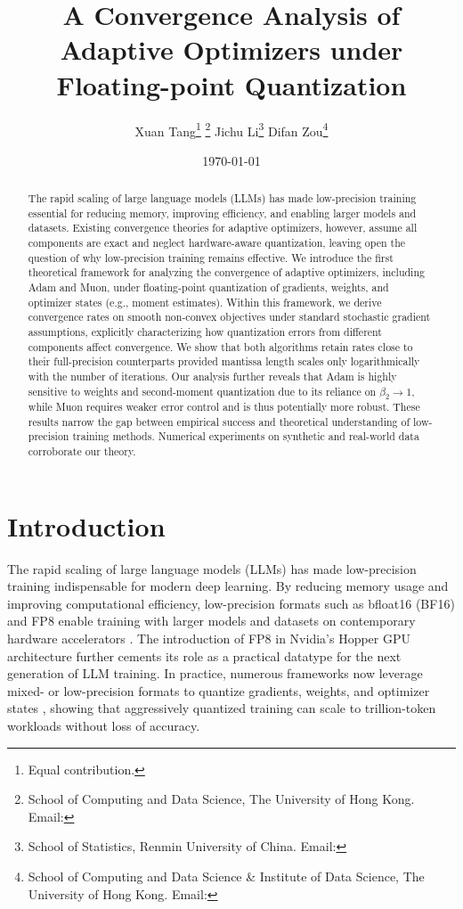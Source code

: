 \documentclass[11pt, letterpaper]{article}
\title{\LARGE A Convergence Analysis of Adaptive Optimizers under Floating-point Quantization}
\author{
Xuan Tang\thanks{Equal contribution.} \thanks{School of Computing and Data Science, The University of Hong Kong. Email: \email{xuantang8}{connect.hku.hk}}
\qquad
Jichu Li\footnotemark[1] \thanks{School of Statistics, Renmin University of China. Email: \email{lijichu52}{gmail.com}}\qquad 
Difan Zou\thanks{School of Computing and Data Science \& Institute of Data Science, The University of Hong Kong. Email: \email{dzou}{hku.hk}}
}
\date{\small{\today}}
\begin{document}

\maketitle

\begin{abstract}
    The rapid scaling of large language models (LLMs) has made low-precision training essential for reducing memory, improving efficiency, and enabling larger models and datasets. Existing convergence theories for adaptive optimizers, however, assume all components are exact and neglect hardware-aware quantization, leaving open the question of why low-precision training remains effective. We introduce the first theoretical framework for analyzing the convergence of adaptive optimizers, including Adam and Muon, under floating-point quantization of gradients, weights, and optimizer states (e.g., moment estimates). Within this framework, we derive convergence rates on smooth non-convex objectives under standard stochastic gradient assumptions, explicitly characterizing how quantization errors from different components affect convergence. We show that both algorithms retain rates close to their full-precision counterparts provided mantissa length scales only logarithmically with the number of iterations. Our analysis further reveals that Adam is highly sensitive to weights and second-moment quantization due to its reliance on $\beta_2 \to 1$, while Muon requires weaker error control and is thus potentially more robust. These results narrow the gap between empirical success and theoretical understanding of low-precision training methods. Numerical experiments on synthetic and real-world data corroborate our theory.
\end{abstract}



\section{Introduction}

The rapid scaling of large language models (LLMs) has made low-precision training indispensable for modern deep learning. By reducing memory usage and improving computational efficiency, low-precision formats such as bfloat16 (BF16) and FP8 enable training with larger models and datasets on contemporary hardware accelerators \citep{peng2023fp8,fishman2025scaling}. The introduction of FP8 in Nvidia’s Hopper GPU architecture \citep{nvidia2022h100,micikevicius2022fp8} further cements its role as a practical datatype for the next generation of LLM training. In practice, numerous frameworks now leverage mixed- or low-precision formats to quantize gradients, weights, and optimizer states \citep{liu2024deepseek,liu2025muon}, showing that aggressively quantized training can scale to trillion-token workloads without loss of accuracy.
\end{document}
